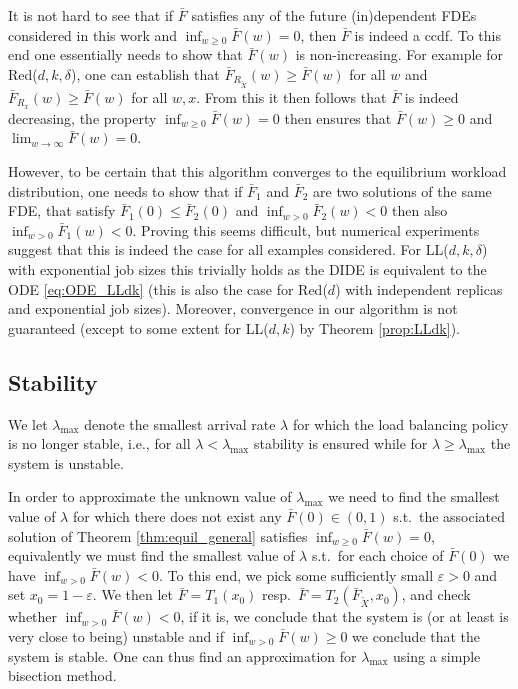 \documentclass[12pt]{report}
\begin{document}
It is not hard to see that if $\bar F$ satisfies any of the future (in)dependent FDEs considered in this work and $\inf_{w\geq 0} \bar F(w) = 0$, then $\bar F$ is indeed a ccdf. To this end one essentially needs to show that $\bar F(w)$ is non-increasing. For example for Red($d,k,\delta$), one can establish that $\bar F_{R_{\tilde X}}(w) \geq \bar F(w)$ for all $w$ and $\bar F_{R_x}(w) \geq \bar F(w)$ for all $w,x$. From this it then follows that $\bar F$ is indeed decreasing, the property $\inf_{w\geq 0} \bar F(w) = 0$ then ensures that $\bar F(w) \geq 0$ and $\lim_{w\rightarrow \infty} \bar F(w) =0$.

However, to be certain that this algorithm converges to the equilibrium workload distribution, one 
needs to show that if $\bar F_1$ and $\bar F_2$ are two solutions of the same FDE, that satisfy $\bar F_1(0) \leq \bar F_2(0)$ and $\inf_{w>0} \bar F_2(w) <0$ then also $\inf_{w>0}\bar F_1(w) <0$. Proving this seems difficult, but numerical experiments suggest that this is indeed the case for all examples considered. For LL($d,k,\delta$) with exponential job sizes this trivially holds as the DIDE is equivalent to the ODE \eqref{eq:ODE_LLdk} (this is also the case for Red($d$) with independent replicas and exponential job sizes). Moreover, convergence in our algorithm is not guaranteed (except to some extent for LL($d,k$) 
by Theorem \ref{prop:LLdk}).

\subsection{Stability} \label{sec:stability}
We let $\lambda_{\max}$ denote the smallest arrival rate $\lambda$ for which the load balancing policy is no longer stable, i.e., for all $\lambda < \lambda_{\max}$ stability is ensured while for $\lambda \geq \lambda_{\max}$ the system is unstable.

In order to approximate the unknown value of $\lambda_{\max}$ we need to find the smallest value of $\lambda$ for which there does not exist any $\bar F(0) \in (0,1)$ s.t.~the associated solution of Theorem \ref{thm:equil_general} satisfies $\inf_{w\geq 0} \bar F(w) = 0$, equivalently we must find the smallest value of $\lambda$ s.t.~for each choice of $\bar F(0)$ we have $\inf_{w> 0} \bar F(w) < 0$. To this end, we pick some sufficiently small $\varepsilon>0$ and set $x_0=1-\varepsilon$. We then let $\bar F=T_1 (x_0)$ resp.~$\bar F=T_2(\bar F_{\tilde X}, x_0)$, and check whether $\inf_{w> 0} \bar F(w) < 0$, if it is, we conclude that the system is (or at least is very close to being) unstable and if $\inf_{w> 0} \bar F(w) \geq 0$ we conclude that the system is stable. One can thus find an approximation for $\lambda_{\max}$ using a simple bisection method.
\end{document}
